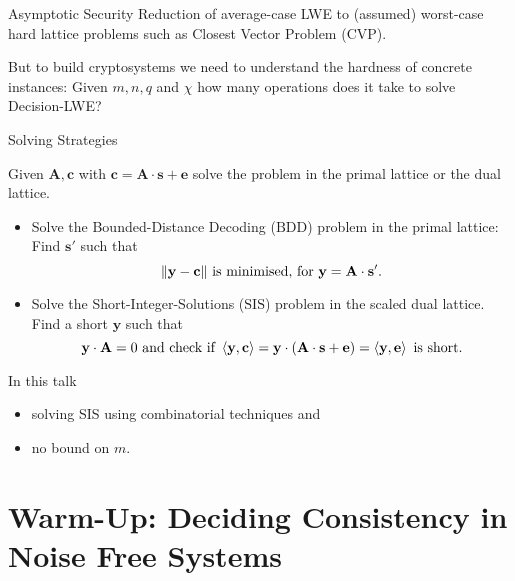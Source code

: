 \documentclass[10pt]{beamer}
\newcommand{\dotp}[2]{\ensuremath{\left\langle {#1},{#2}\right\rangle}\xspace}
\renewcommand{\vec}[1]{\mathbf{#1}\xspace}
\begin{document}
\begin{frame}{Asymptotic Security}
Reduction of average-case LWE to (assumed) worst-case hard lattice problems such as Closest Vector Problem (CVP).

\vspace{1em}\pause
 
But to build cryptosystems we need to understand the hardness of concrete instances: Given $m, n, q$ and $\chi$ how many operations does it take to solve Decision-LWE?

\end{frame}


\begin{frame}{Solving Strategies}

Given $\vec{A},\vec{c}$ with $\vec{c} = \vec{A} \cdot \vec{s} + \vec{e}$ solve the problem in the primal lattice or the dual lattice.

\vspace{1em}

\begin{itemize}

\item Solve the Bounded-Distance Decoding ($\mathrm{BDD}$) problem in the primal lattice: Find $\vec{s'}$ such that
\[
 \|\vec{y} - \vec{c}\| \textnormal{ is minimised, for } \vec{y} = \vec{A} \cdot \vec{s'}.
\]

\pause

\item Solve the Short-Integer-Solutions ($\mathrm{SIS}$) problem in the scaled dual lattice. Find a short $\vec{y}$ such that
\[
 \vec{y} \cdot \vec{A} = 0 \textnormal{ and check if } \dotp{\vec{y}}{\vec{c}} = \vec{y}\cdot \left(\vec{A} \cdot \vec{s} + \vec{e}\right) = \dotp{\vec{y}}{\vec{e}} \textnormal{ is short.}
\]
\end{itemize}

\pause

\begin{block}{In this talk}
\begin{itemize}
 \item solving SIS using combinatorial techniques and
 \item no bound on $m$.
\end{itemize}
\end{block}


\end{frame}


\section{Warm-Up: Deciding Consistency in Noise Free Systems}
\end{document}

